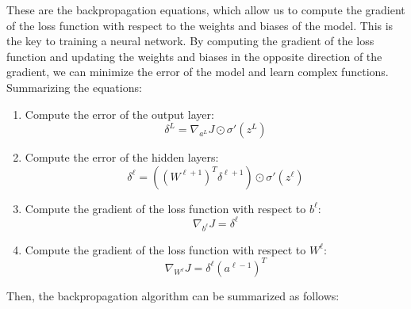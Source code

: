 These are the backpropagation equations, which allow us to compute the gradient of the
loss function with respect to the weights and biases of the model. This is the key to
training a neural network. By computing the gradient of the loss function and updating
the weights and biases in the opposite direction of the gradient, we can minimize the
error of the model and learn complex functions.\\

Summarizing the equations:

\begin{enumerate}
    \item Compute the error of the output layer:
    $$\delta^L = \nabla_{a^L} J \odot \sigma'(z^L)$$

    \item Compute the error of the hidden layers:
    $$\delta^\ell = ((W^{\ell+1})^T \delta^{\ell+1}) \odot \sigma'(z^\ell)$$

    \item Compute the gradient of the loss function with respect to $b^\ell$:
    $$\nabla_{b^\ell} J = \delta^\ell$$

    \item Compute the gradient of the loss function with respect to $W^\ell$:
    $$\nabla_{W^\ell} J = \delta^\ell (a^{\ell-1})^T$$
\end{enumerate}

Then, the backpropagation algorithm can be summarized as follows:

